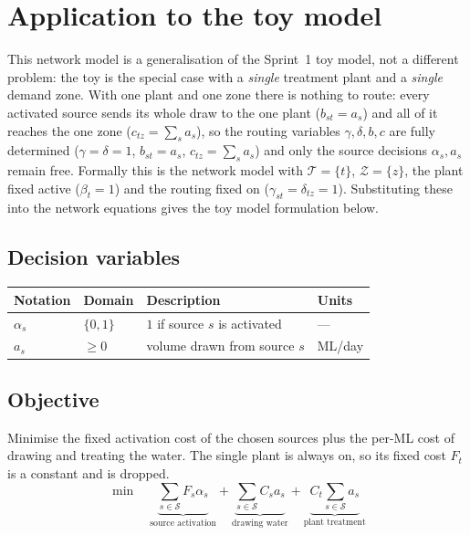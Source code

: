 \documentclass[10pt]{article}
\begin{document}
\section{Application to the toy model}
This network model is a generalisation of the Sprint~1 toy model, not a different problem: the toy is the special case with a \emph{single} treatment plant and a \emph{single} demand zone.
With one plant and one zone there is nothing to route: every activated source sends its whole draw to the one plant ($b_{st}=a_s$) and all of it reaches the one zone ($c_{tz}=\sum_s a_s$), so the routing variables $\gamma,\delta,b,c$ are fully determined ($\gamma=\delta=1$, $b_{st}=a_s$, $c_{tz}=\sum_s a_s$) and only the source decisions $\alpha_s,a_s$ remain free.
Formally this is the network model with $\mathcal{T}=\{t\}$, $\mathcal{Z}=\{z\}$, the plant fixed active ($\beta_t=1$) and the routing fixed on ($\gamma_{st}=\delta_{tz}=1$).
Substituting these into the network equations gives the toy model formulation below.

\subsection{Decision variables}
\begin{center}
    \begin{tabular}{@{}llll@{}}
        \toprule
        \textbf{Notation} & \textbf{Domain} & \textbf{Description}           & \textbf{Units} \\
        \midrule
        $\alpha_{s}$      & $\{0,1\}$       & $1$ if source $s$ is activated & ---            \\
        $a_{s}$           & $\ge 0$         & volume drawn from source $s$   & ML/day         \\
        \bottomrule
    \end{tabular}
\end{center}

\subsection{Objective}
Minimise the fixed activation cost of the chosen sources plus the per-ML cost of drawing and treating the water.
The single plant is always on, so its fixed cost $F_t$ is a constant and is dropped.
\begin{equation}
    \min \quad
    \underbrace{\sum_{s \in \mathcal{S}} F_s \alpha_s}_{\text{source activation}}
    + \underbrace{\sum_{s \in \mathcal{S}} C_s a_s}_{\text{drawing water}}
    + \underbrace{C_t\sum_{s \in \mathcal{S}} a_s}_{\text{plant treatment}}
\end{equation}
\end{document}
